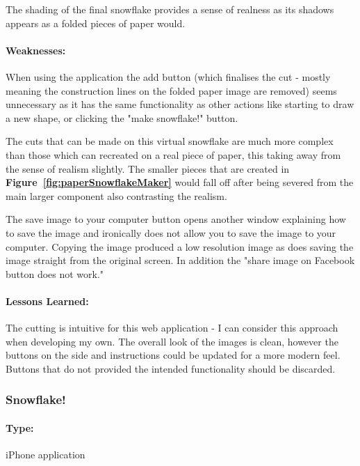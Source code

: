 \documentclass[11pt]{article}
\begin{document}
                 The shading of the final snowflake provides a sense of realness as its shadows appears as a folded pieces of paper would.
                 
                \paragraph{Weaknesses:}
                When using the application the add button (which finalises the cut - mostly meaning the construction lines on the folded paper image are removed) seems unnecessary as it has the same functionality as other actions like starting to draw a new shape, or clicking the "make snowflake!" button.
                
                The cuts that can be made on this virtual snowflake are much more complex than those which can recreated on a real piece of paper, this taking away from the sense of realism slightly. The smaller pieces that are created in \textbf{Figure~\ref{fig:paperSnowflakeMaker}} would fall off after being severed from the main larger component also contrasting the realism.
                
                The save image to your computer button opens another window explaining how to save the image and ironically does not allow you to save the image to your computer. Copying the image produced a low resolution image as does saving the image straight from the original screen. In addition the "share image on Facebook button does not work."
                
                \paragraph{Lessons Learned:}
                The cutting is intuitive for this web application - I can consider this approach when developing my own. The overall look of the images is clean, however the buttons on the side and instructions could be updated for a more modern feel. Buttons that do not provided the intended functionality should be discarded.
                
            \subsubsection{Snowflake!}
            
                \paragraph{Type:} iPhone application 
            
\end{document}
